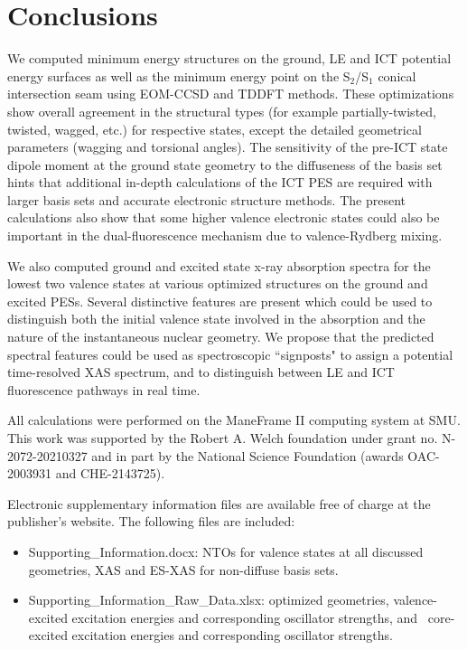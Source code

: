 \documentclass[journal=jacsat,manuscript=article]{achemso}
\begin{document}
\begin{comment}
    I'm not sure this is really interpretable as written:
this distortion is well captured in ES-XAS spectra for excitations from LE as well as ICT states (Figs.~\ref{fig:ES-XAS-CCSD}a and \ref{fig:ES-XAS-DFT}a). 
\end{comment}

\section{Conclusions}

We computed minimum energy structures on the ground, LE and ICT potential energy surfaces as well as the minimum energy point on the S$_2$/S$_1$ conical intersection seam using EOM-CCSD and TDDFT methods. These optimizations show overall agreement in the structural types (for example partially-twisted, twisted, wagged, etc.) for respective states, except the detailed geometrical parameters (wagging and torsional angles). The sensitivity of the pre-ICT state dipole moment at the ground state geometry to the diffuseness of the basis set hints that additional in-depth calculations of the ICT PES are required with larger basis sets and accurate electronic structure methods. The present calculations also show that some higher valence electronic states could also be important in the dual-fluorescence mechanism due to valence-Rydberg mixing.

We also computed ground and excited state x-ray absorption spectra for the lowest two valence states at various optimized structures on the ground and excited PESs. Several distinctive features are present which could be used to distinguish both the initial valence state involved in the absorption and the nature of the instantaneous nuclear geometry. We propose that the predicted spectral features could be used as spectroscopic ``signposts" to assign a potential time-resolved XAS spectrum, and to distinguish between LE and ICT fluorescence pathways in real time.

\begin{acknowledgement}
All calculations were performed on the ManeFrame II computing system at SMU. This work was supported by the Robert A. Welch foundation under grant no. N-2072-20210327 and in part by the National Science Foundation (awards OAC-2003931 and CHE-2143725).
\end{acknowledgement}

\begin{suppinfo}
Electronic supplementary information files are available free of charge at the publisher's website. The following files are included:
\begin{itemize}
\item Supporting\_Information.docx: NTOs for valence states at all discussed geometries, XAS and ES-XAS for non-diffuse basis sets.
\item Supporting\_Information\_Raw\_Data.xlsx: optimized geometries, valence-excited excitation energies and corresponding oscillator strengths, and \
core-excited excitation energies and corresponding oscillator strengths.
\end{itemize}
\end{suppinfo}


\end{document}
